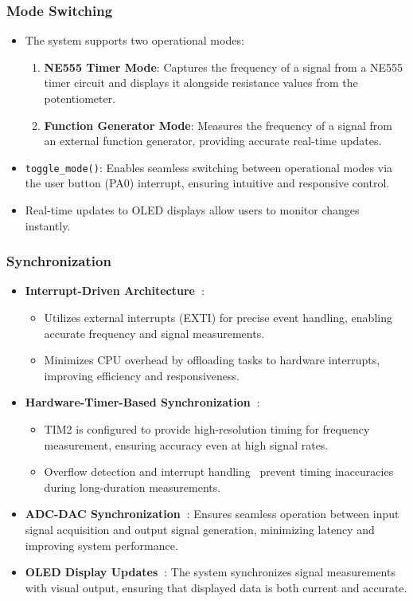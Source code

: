 \subsubsection{Mode Switching}
\begin{itemize}
    \item The system supports two operational modes:
        \begin{enumerate}
            \item \textbf{NE555 Timer Mode}: Captures the frequency of a signal from a NE555 timer circuit and displays it alongside resistance values from the potentiometer.
            \item \textbf{Function Generator Mode}: Measures the frequency of a signal from an external function generator, providing accurate real-time updates.
        \end{enumerate}
    \item \texttt{toggle\_mode()}: Enables seamless switching between operational modes via the user button (PA0) interrupt, ensuring intuitive and responsive control.
    \item Real-time updates to OLED displays allow users to monitor changes instantly.
\end{itemize}

\subsubsection{Synchronization}
\begin{itemize}
    \item \textbf{Interrupt-Driven Architecture~\cite{iox}}: 
        \begin{itemize}
            \item Utilizes external interrupts (EXTI) for precise event handling, enabling accurate frequency and signal measurements.
            \item Minimizes CPU overhead by offloading tasks to hardware interrupts, improving efficiency and responsiveness.
        \end{itemize}
    \item \textbf{Hardware-Timer-Based Synchronization~\cite{iox}}:
        \begin{itemize}
            \item TIM2 is configured to provide high-resolution timing for frequency measurement, ensuring accuracy even at high signal rates.
            \item Overflow detection and interrupt handling~\cite{iox} prevent timing inaccuracies during long-duration measurements.
        \end{itemize}
    \item \textbf{ADC-DAC Synchronization~\cite{stm32-datasheet}}: Ensures seamless operation between input signal acquisition and output signal generation, minimizing latency and improving system performance.
    \item \textbf{OLED Display Updates~\cite{SSD1306_Datasheet}}: The system synchronizes signal measurements with visual output, ensuring that displayed data is both current and accurate.
\end{itemize}

